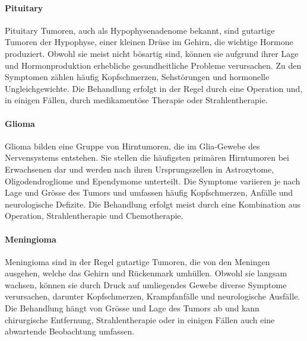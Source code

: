 \paragraph{Pituitary} \label{chap:brain-pituitary}
Pituitary Tumoren, auch als Hypophysenadenome bekannt, sind gutartige Tumoren der Hypophyse, einer kleinen Drüse im Gehirn, die wichtige Hormone produziert. Obwohl sie meist nicht bösartig sind, können sie aufgrund ihrer Lage und Hormonproduktion erhebliche gesundheitliche Probleme verursachen. Zu den Symptomen zählen häufig Kopfschmerzen, Sehstörungen und hormonelle Ungleichgewichte. Die Behandlung erfolgt in der Regel durch eine Operation und, in einigen Fällen, durch medikamentöse Therapie oder Strahlentherapie.

\paragraph{Glioma} \label{chap:brain-gliome}
Glioma bilden eine Gruppe von Hirntumoren, die im Glia-Gewebe des Nervensystems entstehen. Sie stellen die häufigsten primären Hirntumoren bei Erwachsenen dar und werden nach ihren Ursprungszellen in Astrozytome, Oligodendrogliome und Ependymome unterteilt. Die Symptome variieren je nach Lage und Grösse des Tumors und umfassen häufig Kopfschmerzen, Anfälle und neurologische Defizite. Die Behandlung erfolgt meist durch eine Kombination aus Operation, Strahlentherapie und Chemotherapie.

\paragraph{Meningioma} \label{chap:brain-meningioma}
Meningioma sind in der Regel gutartige Tumoren, die von den Meningen ausgehen, welche das Gehirn und Rückenmark umhüllen. Obwohl sie langsam wachsen, können sie durch Druck auf umliegendes Gewebe diverse Symptome verursachen, darunter Kopfschmerzen, Krampfanfälle und neurologische Ausfälle. Die Behandlung hängt von Grösse und Lage des Tumors ab und kann chirurgische Entfernung, Strahlentherapie oder in einigen Fällen auch eine abwartende Beobachtung umfassen. 

\newpage

